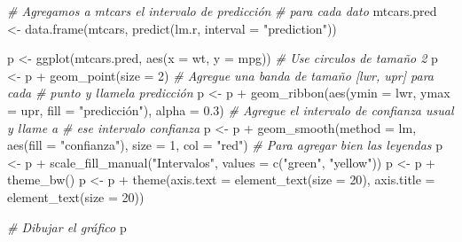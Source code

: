 \documentclass[
  12pt,
]{book}
\newenvironment{Shaded}{\begin{snugshade}}{\end{snugshade}}
\newcommand{\AttributeTok}[1]{\textcolor[rgb]{0.77,0.63,0.00}{#1}}
\newcommand{\CommentTok}[1]{\textcolor[rgb]{0.56,0.35,0.01}{\textit{#1}}}
\newcommand{\DecValTok}[1]{\textcolor[rgb]{0.00,0.00,0.81}{#1}}
\newcommand{\FloatTok}[1]{\textcolor[rgb]{0.00,0.00,0.81}{#1}}
\newcommand{\FunctionTok}[1]{\textcolor[rgb]{0.00,0.00,0.00}{#1}}
\newcommand{\NormalTok}[1]{#1}
\newcommand{\OtherTok}[1]{\textcolor[rgb]{0.56,0.35,0.01}{#1}}
\newcommand{\SpecialCharTok}[1]{\textcolor[rgb]{0.00,0.00,0.00}{#1}}
\newcommand{\StringTok}[1]{\textcolor[rgb]{0.31,0.60,0.02}{#1}}
\theoremstyle{definition}
\theoremstyle{definition}
\theoremstyle{definition}
\theoremstyle{remark}
\begin{document}
\begin{Shaded}
\begin{Highlighting}[]
\CommentTok{\# Agregamos a mtcars el intervalo de predicción}
\CommentTok{\# para cada dato}
\NormalTok{mtcars.pred }\OtherTok{\textless{}{-}} \FunctionTok{data.frame}\NormalTok{(mtcars, }\FunctionTok{predict}\NormalTok{(lm.r, }\AttributeTok{interval =} \StringTok{"prediction"}\NormalTok{))}

\NormalTok{p }\OtherTok{\textless{}{-}} \FunctionTok{ggplot}\NormalTok{(mtcars.pred, }\FunctionTok{aes}\NormalTok{(}\AttributeTok{x =}\NormalTok{ wt, }\AttributeTok{y =}\NormalTok{ mpg))}
\CommentTok{\# Use circulos de tamaño 2}
\NormalTok{p }\OtherTok{\textless{}{-}}\NormalTok{ p }\SpecialCharTok{+} \FunctionTok{geom\_point}\NormalTok{(}\AttributeTok{size =} \DecValTok{2}\NormalTok{)}
\CommentTok{\# Agregue una banda de tamaño [lwr, upr] para cada}
\CommentTok{\# punto y llamela \textquotesingle{}predicción\textquotesingle{}}
\NormalTok{p }\OtherTok{\textless{}{-}}\NormalTok{ p }\SpecialCharTok{+} \FunctionTok{geom\_ribbon}\NormalTok{(}\FunctionTok{aes}\NormalTok{(}\AttributeTok{ymin =}\NormalTok{ lwr, }\AttributeTok{ymax =}\NormalTok{ upr, }\AttributeTok{fill =} \StringTok{"predicción"}\NormalTok{), }
    \AttributeTok{alpha =} \FloatTok{0.3}\NormalTok{)}
\CommentTok{\# Agregue el intervalo de confianza usual y llame a}
\CommentTok{\# ese intervalo \textquotesingle{}confianza\textquotesingle{}}
\NormalTok{p }\OtherTok{\textless{}{-}}\NormalTok{ p }\SpecialCharTok{+} \FunctionTok{geom\_smooth}\NormalTok{(}\AttributeTok{method =}\NormalTok{ lm, }\FunctionTok{aes}\NormalTok{(}\AttributeTok{fill =} \StringTok{"confianza"}\NormalTok{), }
    \AttributeTok{size =} \DecValTok{1}\NormalTok{, }\AttributeTok{col =} \StringTok{"red"}\NormalTok{)}
\CommentTok{\# Para agregar bien las leyendas}
\NormalTok{p }\OtherTok{\textless{}{-}}\NormalTok{ p }\SpecialCharTok{+} \FunctionTok{scale\_fill\_manual}\NormalTok{(}\StringTok{"Intervalos"}\NormalTok{, }\AttributeTok{values =} \FunctionTok{c}\NormalTok{(}\StringTok{"green"}\NormalTok{, }
    \StringTok{"yellow"}\NormalTok{))}
\NormalTok{p }\OtherTok{\textless{}{-}}\NormalTok{ p }\SpecialCharTok{+} \FunctionTok{theme\_bw}\NormalTok{()}
\NormalTok{p }\OtherTok{\textless{}{-}}\NormalTok{ p }\SpecialCharTok{+} \FunctionTok{theme}\NormalTok{(}\AttributeTok{axis.text =} \FunctionTok{element\_text}\NormalTok{(}\AttributeTok{size =} \DecValTok{20}\NormalTok{), }
    \AttributeTok{axis.title =} \FunctionTok{element\_text}\NormalTok{(}\AttributeTok{size =} \DecValTok{20}\NormalTok{))}

\CommentTok{\# Dibujar el gráfico}
\NormalTok{p}
\end{Highlighting}
\end{Shaded}
\end{document}

